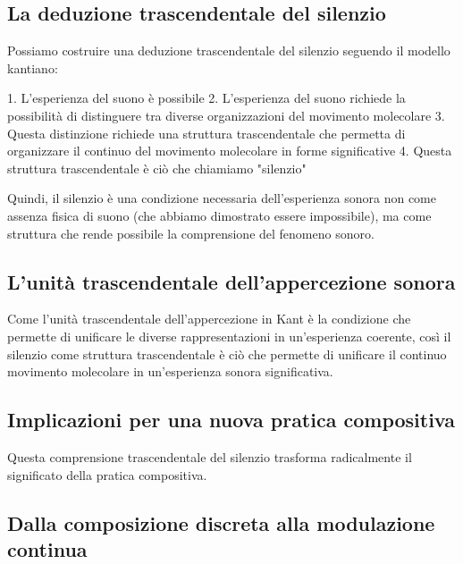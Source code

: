 \documentclass[a4paper,11pt]{article}
\begin{document}
\subsection{La deduzione trascendentale del silenzio}\hypertarget{la-deduzione-trascendentale-del-silenzio}{}\label{la-deduzione-trascendentale-del-silenzio}

Possiamo costruire una deduzione trascendentale del silenzio seguendo il
modello kantiano:

1. L'esperienza del suono è possibile 2. L'esperienza del suono
richiede la possibilità di distinguere tra diverse organizzazioni del
movimento molecolare 3. Questa distinzione richiede una struttura
trascendentale che permetta di organizzare il continuo del movimento
molecolare in forme significative 4. Questa struttura trascendentale è
ciò che chiamiamo "silenzio"

Quindi, il silenzio è una condizione necessaria dell'esperienza sonora
non come assenza fisica di suono (che abbiamo dimostrato essere
impossibile), ma come struttura che rende possibile la comprensione del
fenomeno sonoro.

\subsection{L'unità trascendentale dell'appercezione sonora}\hypertarget{lunit-trascendentale-dellappercezione-sonora}{}\label{lunit-trascendentale-dellappercezione-sonora}

Come l'unità trascendentale dell'appercezione in Kant è la condizione
che permette di unificare le diverse rappresentazioni in un'esperienza
coerente, così il silenzio come struttura trascendentale è ciò che
permette di unificare il continuo movimento molecolare in un'esperienza
sonora significativa.

\subsection{Implicazioni per una nuova pratica compositiva}\hypertarget{implicazioni-per-una-nuova-pratica-compositiva}{}\label{implicazioni-per-una-nuova-pratica-compositiva}

Questa comprensione trascendentale del silenzio trasforma radicalmente
il significato della pratica compositiva.

\subsection{Dalla composizione discreta alla modulazione continua}\hypertarget{dalla-composizione-discreta-alla-modulazione-continua}{}\label{dalla-composizione-discreta-alla-modulazione-continua}
\end{document}
